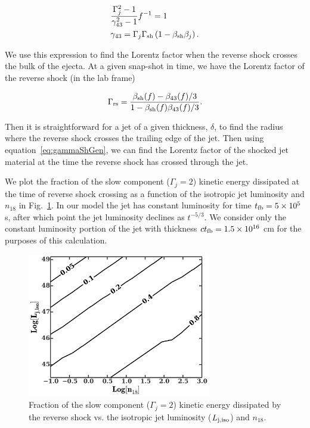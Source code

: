 \documentclass[usenatbib,fleqn]{mnras}
\begin{document}
\begin{align}
&\frac{\Gamma_j^2-1}{\gamma_{43}^2-1} f^{-1}=1\\
&\gamma_{43}=\Gamma_j \Gamma_{\rm sh} \left(1-\beta_{\rm sh} \beta_j\right).
\label{eq:gammaShGen}
\end{align}

We use this expression to find the Lorentz factor when the reverse
shock crosses the bulk of the ejecta.  At a given snap-shot in time,
we have the Lorentz factor of the reverse shock (in the lab frame)

\begin{equation}
\Gamma_{\rm rs}=\frac{\beta_{\rm sh}(f)-\beta_{43}(f)/3}{1-\beta_{\rm
    sh}(f) \beta_{43}(f)/3}.
\end{equation} 

Then it is straightforward for a jet of a given thickness, $\delta$,
to find the radius where the reverse shock crosses the trailing edge
of the jet. Then using equation~\eqref{eq:gammaShGen}, we can find the
Lorentz factor of the shocked jet material at the time the reverse
shock has crossed through the jet.  

We plot the fraction of the slow component ($\Gamma_j=2$) kinetic
energy dissipated at the time of reverse shock crossing as a function
of the isotropic jet luminosity and $n_{18}$ in
Fig.~\ref{fig:diss}. In our model the jet has constant luminosity for
time $t_{\rm fb}=5\times 10^5$ s, after which point the jet luminosity
declines as $t^{-5/3}$. We consider only the constant luminosity
portion of the jet with thickness $c t_{\rm fb}=1.5 \times 10^{16}$ cm
for the purposes of this calculation.

\begin{figure}
\includegraphics[width=8cm]{diss.pdf}
\caption{\label{fig:diss} Fraction of the slow component
  ($\Gamma_j=2$) kinetic energy dissipated by the reverse shock
  vs. the isotropic jet luminosity ($L_{\rm j,iso}$) and $n_{18}$.}
\end{figure}
\end{document}
